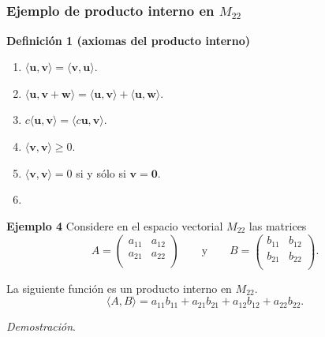 
\subsection{}

{\nologo
\begin{frame}\frametitle{Ejemplo de producto interno en $M_{22}$}
	
	\begin{block}{\textbf{Definición 1 (axiomas del producto interno)}}	
		\begin{multicols}{2}		
			\begin{enumerate}			
				\justifying
				\item[\labelname{$a$}] $\langle \mathbf{u}, \mathbf{v}\rangle = \langle \mathbf{v}, \mathbf{u}\rangle$. \\%
				\item[\labelname{$b$}] $\langle \mathbf{u}, \mathbf{v}+\mathbf{w}\rangle 
				= \langle \mathbf{u}, \mathbf{v}\rangle + \langle \mathbf{u}, \mathbf{w}\rangle$. \\%
				\item[\labelname{$c$}] $c\langle \mathbf{u}, \mathbf{v}\rangle = \langle c\mathbf{u}, \mathbf{v}\rangle$.\\
				\columnbreak
				\item[\labelname{$d$}] $\langle \mathbf{v}, \mathbf{v}\rangle \geq 0 $. 
				\item[\labelname{$e$}] $\langle \mathbf{v}, \mathbf{v}\rangle = 0 $ si y sólo si $\mathbf{v}=\mathbf{0}$. 
				\item[]
			\end{enumerate}		
		\end{multicols}
		
	\end{block}
	
	\begin{ej}{\textbf{Ejemplo 4}}\justifying
		Considere en el espacio vectorial $M_{22}$ las matrices
		\[
			A = 
			\left(
			\begin{array}{cc}
				a_{11} & a_{12} \\[1mm]
				a_{21} & a_{22} \\
			\end{array}
			\right)
			\qquad \text{y} \qquad
			B = 
			\left(
			\begin{array}{cc}
			b_{11} & b_{12} \\[1mm]
			b_{21} & b_{22} \\
			\end{array}
			\right).
		\]
		
		\vspace{-0mm}
		La siguiente función es un producto interno en $M_{22}$.
		\[
			\langle A, B\rangle = a_{11}b_{11} + a_{21}b_{21} +a_{12}b_{12} +a_{22}b_{22}.
		\]		
	\end{ej}
	\textit{Demostración}.
	
\end{frame}
}

